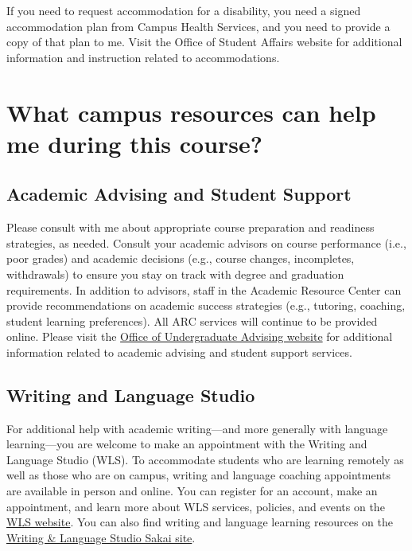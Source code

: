 \documentclass[11pt]{article}
\begin{document}
If you need to request accommodation for a disability, you need a signed accommodation plan from Campus Health Services, and you need to provide a copy of that plan to me. Visit the Office of Student Affairs website for additional information and instruction related to accommodations. 



\section{What campus resources can help me during this course?}

\subsection{Academic Advising and Student Support}
Please consult with me about appropriate course preparation and readiness strategies, as needed.  Consult your academic advisors on course performance (i.e., poor grades) and academic decisions (e.g., course changes, incompletes, withdrawals) to ensure you stay on track with degree and graduation requirements. In addition to advisors, staff in the Academic Resource Center can provide recommendations on academic success strategies (e.g., tutoring, coaching, student learning preferences).  All ARC services will continue to be provided online. Please visit the \href{https://dukekunshan.edu.cn/en/academics/advising}{Office of Undergraduate Advising website} for additional information related to academic advising and student support services. 

\subsection{Writing and Language Studio}

For additional help with academic writing---and more generally with language learning---you are welcome to make an appointment with the Writing and Language Studio (WLS). To accommodate students who are learning remotely as well as those who are on campus, writing and language coaching appointments are available in person and online. You can register for an account, make an appointment, and learn more about WLS services, policies, and events on the \href{https://dukekunshan.edu.cn/en/academics/language-and-culture-center/writing-and-language-studio}{WLS website}. You can also find writing and language learning resources on the \href{https://sakai.duke.edu/x/mQ6xqG}{Writing \& Language Studio Sakai site}.
\end{document}
